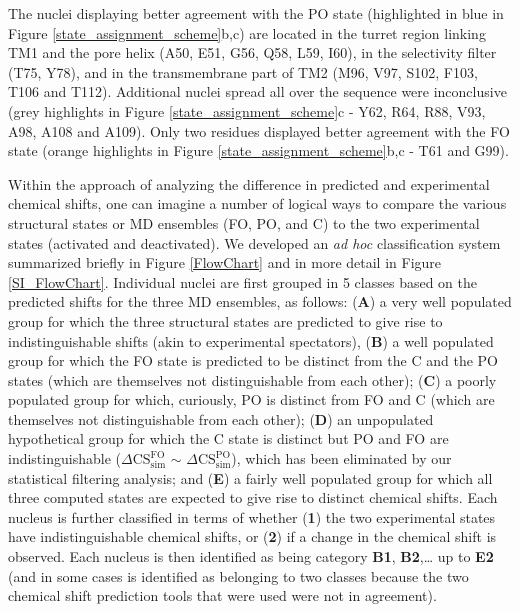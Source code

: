 \documentclass[%
 aip,
 amsmath,amssymb,
 preprint,%
]{revtex4-1}
\begin{document}
The nuclei displaying better agreement with the PO state (highlighted in blue in Figure \ref{state_assignment_scheme}b,c) are located in the turret region linking TM1 and the pore helix (A50, E51, G56, Q58, L59, I60), in the selectivity filter (T75, Y78), and in the transmembrane part of TM2 (M96, V97, S102, F103, T106 and T112). Additional nuclei spread all over the sequence were inconclusive (grey highlights in Figure \ref{state_assignment_scheme}c - Y62, R64, R88, V93, A98, A108 and A109). Only two residues displayed better agreement with the FO state (orange highlights in Figure \ref{state_assignment_scheme}b,c - T61 and G99).

Within the approach of analyzing the difference in predicted and experimental chemical shifts, one can imagine a number of logical ways to compare the various structural states or MD ensembles (FO, PO, and C) to the two experimental states (activated and deactivated). We developed an \textit{ad hoc} classification system summarized briefly in Figure \ref{FlowChart} and in more detail in Figure \ref{SI_FlowChart}. Individual nuclei are first grouped in 5 classes based on the predicted shifts for the three MD ensembles, as follows: (\textbf{A}) a very well populated group for which the three structural states are predicted to give rise to indistinguishable shifts (akin to experimental spectators), (\textbf{B}) a well populated group for which the FO state is predicted to be distinct from the C and the PO states (which are themselves not distinguishable from each other); (\textbf{C}) a poorly populated group for which, curiously, PO is distinct from FO and C (which are themselves not distinguishable from each other); (\textbf{D}) an unpopulated hypothetical group for which the C state is distinct but PO and FO are indistinguishable ($\Delta\text{CS}_{\text{sim}}^{\text{FO}}$ $\sim$ $\Delta\text{CS}_{\text{sim}}^{\text{PO}}$), which has been eliminated by our statistical filtering analysis; and (\textbf{E}) a fairly well populated group for which all three computed states are expected to give rise to distinct chemical shifts. Each nucleus is further classified in terms of whether (\textbf{1}) the two experimental states have indistinguishable chemical shifts, or (\textbf{2}) if a change in the chemical shift is observed. Each nucleus is then identified as being category \textbf{B1}, \textbf{B2},… up to \textbf{E2} (and in some cases is identified as belonging to two classes because the two chemical shift prediction tools that were used were not in agreement).
\end{document}
